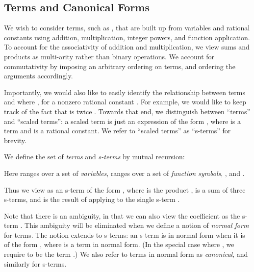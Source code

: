 \documentclass[runningheds]{llncs}
\begin{document}
\subsection{Terms and Canonical Forms}
\label{subsection:terms}

We wish to consider terms, such as , that are built up from variables and rational constants using addition, multiplication, integer powers, and function application. To account for the associativity of addition and multiplication, we view sums and products as multi-arity rather than binary operations. We account for  commutativity by imposing an arbitrary ordering on terms, and ordering the arguments accordingly.

Importantly, we would also like to easily identify the relationship between terms  and  where , for a nonzero rational constant . For example, we would like to keep track of the fact that  is twice . Towards that end, we distinguish between ``terms'' and ``scaled terms'': a scaled term is just an expression of the form , where  is a term and  is a rational constant. We refer to ``scaled terms'' as ``s-terms'' for brevity.

\begin{definition}
  We define the set of \emph{terms}  and \emph{
    s-terms}  by mutual recursion:

Here  ranges over a set of \emph{variables},  ranges over a set of \emph{function symbols}, , and .
\end{definition}
Thus we view  as an s-term of the form , where  is the product ,  is a sum of three s-terms, and  is the result of applying  to the single s-term . 

Note that there is an ambiguity, in that we can also view the coefficient  as the s-term . This ambiguity will be eliminated when we define a notion of \emph{normal form} for terms. The notion extends to s-terms: an s-term is in normal form when it is of the form , where  is a term in normal form. (In the special case where , we require  to be the term .) We also refer to terms in normal form as \emph{canonical}, and similarly for s-terms.
\end{document}
